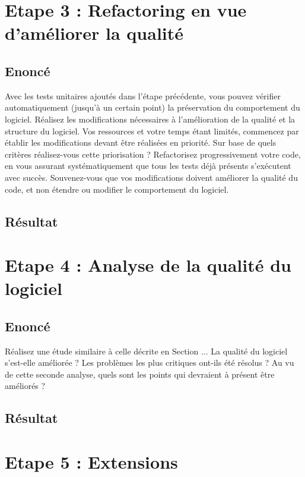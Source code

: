 \documentclass[12pt,a4paper,final]{article}
\begin{document}
\section{Etape 3 : Refactoring en vue d'améliorer la qualité}\label{sec:etape3}
\subsection{Enoncé}
Avec les tests unitaires ajoutés dans l'étape précédente, vous pouvez vérifier automatiquement (jusqu'à un certain point) la préservation du comportement du logiciel. Réalisez les modifications nécessaires à l'amélioration de la qualité et la structure du logiciel. 
Vos ressources et votre temps étant limités, commencez par établir les modifications devant être réalisées en priorité. Sur base de quels critères réalisez-vous cette priorisation ?
Refactorisez progressivement votre code, en vous assurant systématiquement que tous les tests déjà présents s'exécutent avec succès. Souvenez-vous que vos modifications doivent améliorer la qualité du code, et non étendre ou modifier le comportement du logiciel.

\subsection{Résultat}



\newpage
\section{Etape 4 : Analyse de la qualité du logiciel}\label{sec:etape4}
\subsection{Enoncé}
Réalisez une étude similaire à celle décrite en Section ... La qualité du logiciel s'est-elle améliorée ? Les problèmes les plus critiques ont-ils été résolus ? Au vu de cette seconde analyse, quels sont les points qui devraient à présent être améliorés ?
\subsection{Résultat}



\newpage
\section{Etape 5 : Extensions}\label{sec:etape5}
\end{document}
